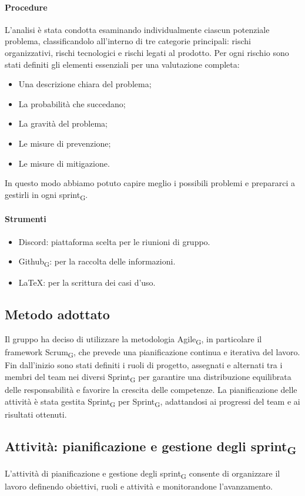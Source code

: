 \documentclass[11pt,a4paper]{article}
\newcommand{\gls}[1]{#1\textsubscript{G}}
\begin{document}
\paragraph{Procedure}
L’analisi è stata condotta esaminando individualmente ciascun potenziale problema, classificandolo all’interno di tre categorie principali: rischi organizzativi, rischi tecnologici e rischi legati al prodotto.
Per ogni rischio sono stati definiti gli elementi essenziali per una valutazione completa:
\begin{itemize}
\item Una descrizione chiara del problema;
\item La probabilità che succedano;
\item La gravità del problema;
\item Le misure di prevenzione;
\item Le misure di mitigazione.
\end{itemize}
In questo modo abbiamo potuto capire meglio i possibili problemi e prepararci a gestirli in ogni \gls{sprint}.

\paragraph{Strumenti}
\begin{itemize}
\item Discord: piattaforma scelta per le riunioni di gruppo.
\item \gls{Github}: per la raccolta delle informazioni.
\item LaTeX: per la scrittura dei casi d'uso.
\end{itemize}

\subsection{Metodo adottato}
Il gruppo ha deciso di utilizzare la metodologia \gls{Agile}, in particolare il framework \gls{Scrum}, che prevede una pianificazione continua e iterativa del lavoro. 
Fin dall’inizio sono stati definiti i ruoli di progetto, assegnati e alternati tra i membri del team nei diversi \gls{Sprint} per garantire una distribuzione equilibrata delle responsabilità e favorire la crescita delle competenze.
La pianificazione delle attività è stata gestita \gls{Sprint} per \gls{Sprint}, adattandosi ai progressi del team e ai risultati ottenuti. 

\subsection{Attività: pianificazione e gestione degli \gls{sprint}}
L’attività di pianificazione e gestione degli \gls{sprint} consente di organizzare il lavoro definendo obiettivi, ruoli e attività e monitorandone l’avanzamento.
\end{document}

